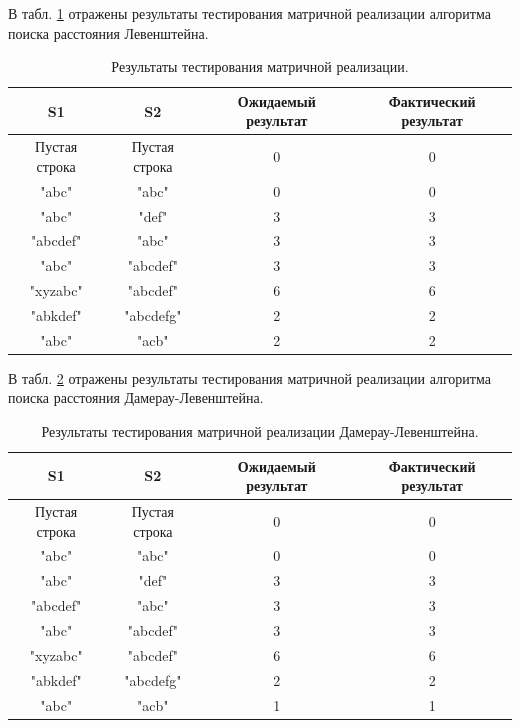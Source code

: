 В табл. \ref{table-testing-results-iterative} отражены результаты тестирования матричной
реализации алгоритма поиска расстояния Левенштейна.

\begin{table}
    \caption{Результаты тестирования матричной реализации.}
    \label{table-testing-results-iterative}
    \begin{center}
        \begin{tabular}{|c|c|c|c|}
            \hline
            S1 & S2 & Ожидаемый результат & Фактический результат \\
            \hline
            Пустая строка & Пустая строка & 0 & 0\\
            \hline
            "abc" & "abc" & 0 & 0\\
            \hline
            "abc" & "def" & 3 & 3\\
            \hline
            "abcdef" & "abc" & 3 & 3\\
            \hline
            "abc" & "abcdef" & 3 & 3\\
            \hline
            "xyzabc" & "abcdef" & 6 & 6\\
            \hline
            "abkdef" & "abcdefg" & 2 & 2\\
            \hline
            "abc" & "acb" & 2 & 2\\
            \hline
        \end{tabular}
    \end{center}
\end{table}

В табл. \ref{table-testing-results-damerau} отражены результаты тестирования матричной
реализации алгоритма поиска расстояния Дамерау-Левенштейна.

\begin{table}
    \caption{Результаты тестирования матричной реализации Дамерау-Левенштейна.}
    \label{table-testing-results-damerau}
    \begin{center}
        \begin{tabular}{|c|c|c|c|}
            \hline
            S1 & S2 & Ожидаемый результат & Фактический результат \\
            \hline
            Пустая строка & Пустая строка & 0 & 0\\
            \hline
            "abc" & "abc" & 0 & 0\\
            \hline
            "abc" & "def" & 3 & 3\\
            \hline
            "abcdef" & "abc" & 3 & 3\\
            \hline
            "abc" & "abcdef" & 3 & 3\\
            \hline
            "xyzabc" & "abcdef" & 6 & 6\\
            \hline
            "abkdef" & "abcdefg" & 2 & 2\\
            \hline
            "abc" & "acb" & 1 & 1\\
            \hline
        \end{tabular}
    \end{center}
\end{table}

